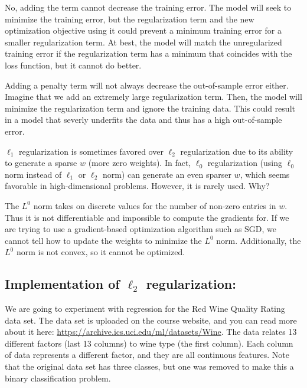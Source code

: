 \begin{solution}
  No, adding the term cannot decrease the training error. The model will seek to minimize the training error, but the regularization term and the new optimization objective using it could prevent a minimum training error for a smaller regularization term. At best, the model will match the unregularized training error if the regularization term has a minimum that coincides with the loss function, but it cannot do better.

  Adding a penalty term will not always decrease the out-of-sample error either. Imagine that we add an extremely large regularization term. Then, the model will minimize the regularization term and ignore the training data. This could result in a model that severly underfits the data and thus has a high out-of-sample error.
\end{solution}

\problem[4]
$\ell_1$ regularization is sometimes favored over $\ell_2$ regularization due to its ability to generate a sparse $w$ (more zero weights).
In fact, $\ell_0$ regularization (using $\ell_0$ norm instead of $\ell_1$ or $\ell_2$ norm) can generate an even sparser $w$, which seems favorable in high-dimensional problems.
However, it is rarely used.  Why?

\begin{solution}
  The $L^0$ norm takes on discrete values for the number of non-zero entries in $w$. Thus it is not differentiable and impossible to compute the gradients for. If we are trying to use a gradient-based optimization algorithm such as SGD, we cannot tell how to update the weights to minimize the $L^0$ norm. Additionally, the $L^0$ norm is not convex, so it cannot be optimized.
\end{solution}

\newpage

\subsection{Implementation of \texorpdfstring{$\ell_2$}{L2} regularization:}

We are going to experiment with regression for the Red Wine Quality Rating data set. The data set is uploaded on the course website, and you can read more about it here: \url{https://archive.ics.uci.edu/ml/datasets/Wine}. The data relates 13 different factors (last 13 columns) to wine type (the first column). Each column of data represents a different factor, and they are all continuous features. Note that the original data set has three classes, but one was removed to make this a binary classification problem.

